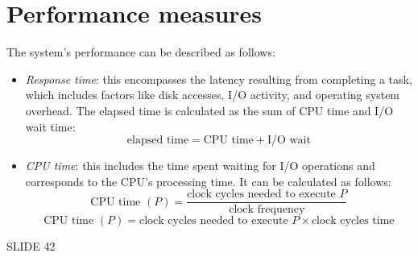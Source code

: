 \section{Performance measures}

The system's performance can be described as follows:
\begin{itemize}
    \item \textit{Response time}: this encompasses the latency resulting from completing a task, which includes factors like disk accesses, I/O activity, and operating system overhead. 
        The elapsed time is calculated as the sum of CPU time and I/O wait time:
        \[\text{elapsed time}=\text{CPU time} + \text{I/O wait}\]
    \item \textit{CPU time}: this includes the time spent waiting for I/O operations and corresponds to the CPU's processing time. 
        It can be calculated as follows:
        \[\text{CPU time }(P) = \dfrac{\text{clock cycles needed to execute } P}{\text{clock frequency}}\] 
        \[\text{CPU time }(P) = \text{clock cycles needed to execute } P \times \text{clock cycles time}\] 
\end{itemize}

SLIDE 42





















